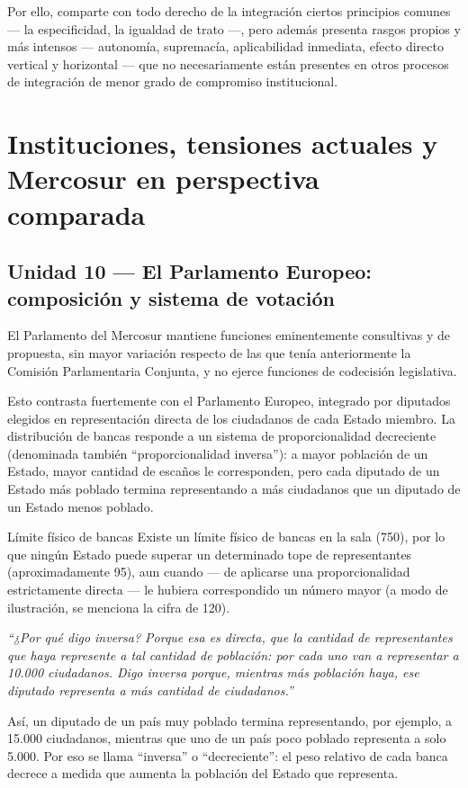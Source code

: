 \documentclass[12pt,oneside]{book}
\begin{document}
Por ello, comparte con todo derecho de la integración ciertos principios comunes --- la especificidad, la igualdad de trato ---, pero además presenta rasgos propios y más intensos --- autonomía, supremacía, aplicabilidad inmediata, efecto directo vertical y horizontal --- que no necesariamente están presentes en otros procesos de integración de menor grado de compromiso institucional.

\chapter{Instituciones, tensiones actuales y Mercosur en perspectiva comparada}

\section{Unidad 10 --- El Parlamento Europeo: composición y sistema de votación}

El Parlamento del Mercosur mantiene funciones eminentemente consultivas y de propuesta, sin mayor variación respecto de las que tenía anteriormente la Comisión Parlamentaria Conjunta, y no ejerce funciones de codecisión legislativa.

Esto contrasta fuertemente con el Parlamento Europeo, integrado por diputados elegidos en representación directa de los ciudadanos de cada Estado miembro. La distribución de bancas responde a un sistema de proporcionalidad decreciente (denominada también ``proporcionalidad inversa''): a mayor población de un Estado, mayor cantidad de escaños le corresponden, pero cada diputado de un Estado más poblado termina representando a más ciudadanos que un diputado de un Estado menos poblado.

\begin{example}{Límite físico de bancas}
Existe un límite físico de bancas en la sala (750), por lo que ningún Estado puede superar un determinado tope de representantes (aproximadamente 95), aun cuando --- de aplicarse una proporcionalidad estrictamente directa --- le hubiera correspondido un número mayor (a modo de ilustración, se menciona la cifra de 120).

\textit{``¿Por qué digo inversa? Porque esa es directa, que la cantidad de representantes que haya represente a tal cantidad de población: por cada uno van a representar a 10.000 ciudadanos. Digo inversa porque, mientras más población haya, ese diputado representa a más cantidad de ciudadanos.''}

Así, un diputado de un país muy poblado termina representando, por ejemplo, a 15.000 ciudadanos, mientras que uno de un país poco poblado representa a solo 5.000. Por eso se llama ``inversa'' o ``decreciente'': el peso relativo de cada banca decrece a medida que aumenta la población del Estado que representa.
\end{example}
\end{document}
